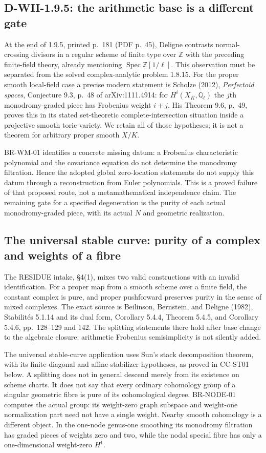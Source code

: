\subsection{D-WII-1.9.5: the arithmetic base is a different gate}

At the end of 1.9.5, printed p.~181 (PDF p.~45), Deligne contrasts
normal-crossing divisors in a regular scheme of finite type over
$\mathbb Z$ with the preceding finite-field theory, already mentioning
$\operatorname{Spec}\mathbb Z[1/\ell]$. This observation must be
separated from the solved complex-analytic problem 1.8.15.
For the proper smooth local-field case a precise modern statement is
Scholze (2012), \emph{Perfectoid spaces}, Conjecture 9.3, p.~48
of arXiv:1111.4914:
for $H^i(X_{\overline K},\mathbb Q_\ell)$ the $j$th monodromy-graded
piece has Frobenius weight $i+j$. His Theorem 9.6, p.~49, proves
this in its stated set-theoretic complete-intersection situation
inside a projective smooth toric variety. We retain all of those
hypotheses; it is not a theorem for arbitrary proper smooth $X/K$.

BR-WM-01 identifies a concrete missing datum: a Frobenius
characteristic polynomial and the covariance equation do not determine
the monodromy filtration. Hence the adopted global zero-location
statements do not supply this datum through a reconstruction from
Euler polynomials. This is a proved failure of that proposed route,
not a metamathematical independence claim. The remaining gate for a
specified degeneration is the purity of each actual monodromy-graded
piece, with its actual $N$ and geometric realization.

\subsection{The universal stable curve: purity of a complex and weights of a fibre}

The RESIDUE intake, \S4(1), mixes two valid constructions with an
invalid identification. For a proper map from a smooth scheme over
a finite field, the constant complex is pure, and proper pushforward
preserves purity in the sense of mixed complexes. The exact source is
Beilinson, Bernstein, and Deligne (1982), Stabilit\'es 5.1.14 and its dual
form, Corollary 5.4.4, Theorem 5.4.5, and Corollary 5.4.6,
pp.~128--129 and 142. The splitting statements there hold after
base change to the algebraic closure: arithmetic Frobenius
semisimplicity is not silently added.

The universal stable-curve application uses Sun's stack decomposition
theorem, with its finite-diagonal and affine-stabilizer hypotheses,
as proved in CC-ST01 below. A splitting does not in general descend
merely from its existence on scheme charts. It does not say that every ordinary
cohomology group of a singular geometric fibre is pure of its
cohomological degree. BR-NODE-01 computes the actual group: its
weight-zero graph subspace and weight-one normalization part need
not have a single weight. Nearby smooth cohomology is a different
object. In the one-node genus-one smoothing its monodromy filtration
has graded pieces of weights zero and two, while the nodal special
fibre has only a one-dimensional weight-zero $H^1$.

